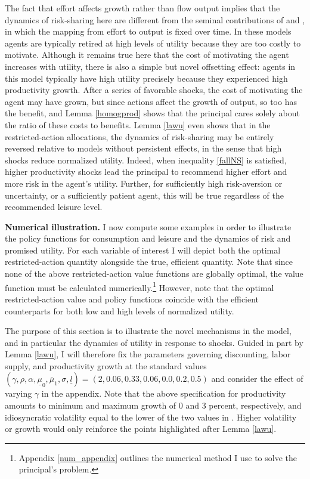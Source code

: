 \documentclass[11pt]{article}
\theoremstyle{plain}
\newcommand{\alphval}{0.33}
\newcommand{\sig}{0.2}
\newcommand{\lbar}{0.5}
\newcommand{\mulow}{0.0}
\newcommand{\muhigh}{0.06}
\newcommand{\rhoval}{0.06}
\begin{document}
The fact that effort affects growth rather than flow output implies that the dynamics of risk-sharing here are different from the seminal contributions of \cite{phelan_computing_1991} and \cite{sannikov_continuous-time_2008}, in which the mapping from effort to output is fixed over time. In these models agents are typically retired at high levels of utility because they are too costly to motivate. Although it remains true here that the cost of motivating the agent increases with utility, there is also a simple but novel offsetting effect: agents in this model typically have high utility precisely because they experienced high productivity growth. After a series of favorable shocks, the cost of motivating the agent may have grown, but since actions affect the growth of output, so too has the benefit, and Lemma \ref{homogprod} shows that the principal cares solely about the ratio of these costs to benefits. Lemma \ref{lawu} even shows that in the restricted-action allocations, the dynamics of risk-sharing may be entirely reversed relative to models without persistent effects, in the sense that high shocks reduce normalized utility. Indeed, when inequality \eqref{fallNS} is satisfied, higher productivity shocks lead the principal to recommend higher effort and more risk in the agent's utility. Further, for sufficiently high risk-aversion or uncertainty, or a sufficiently patient agent, this will be true regardless of the recommended leisure level. 


\textbf{Numerical illustration.} I now compute some examples in order to illustrate the policy functions for consumption and leisure and the dynamics of risk and promised utility. For each variable of interest I will depict both the optimal restricted-action quantity alongside the true, efficient quantity. Note that since none of the above restricted-action value functions are globally optimal, the value function must be calculated numerically.\footnote{Appendix \ref{num_appendix} outlines the numerical method I use to solve the principal's problem.} However, note that the optimal restricted-action value and policy functions coincide with the efficient counterparts for both low and high levels of normalized utility. 

The purpose of this section is to illustrate the novel mechanisms in the model, and in particular the dynamics of utility in response to shocks. Guided in part by Lemma \ref{lawu}, I will therefore fix the parameters governing discounting, labor supply, and productivity growth at the standard values $(\gamma, \rho, \alpha, \underline{\mu}_0, \overline{\mu}_1, \sigma, \underline{l}) = (2, \rhoval, \alphval, \muhigh, \mulow, \sig, \lbar)$ and consider the effect of varying $\gamma$ in the appendix. Note that the above specification for productivity amounts to minimum and maximum growth of 0 and 3 percent, respectively, and idiosyncratic volatility equal to the lower of the two values in \cite{angeletos_uninsured_2007}. Higher volatility or growth would only reinforce the points highlighted after Lemma \ref{lawu}. 
\end{document}
